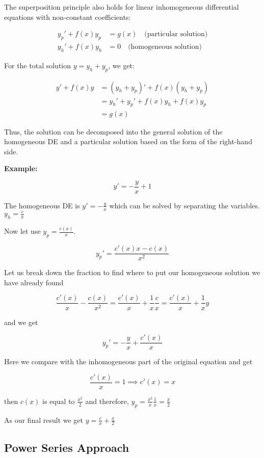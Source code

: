 The superposition principle also holds for linear inhomogeneous differential equations with 
non-constant coefficients:

\begin{align*}
    y_p' + f(x)y_p &= g(x) \quad \text{(particular solution)} \\
    y_h' + f(x)y_h &= 0 \quad \text{(homogeneous solution)}
\end{align*}

For the total solution \( y = y_h + y_p \), we get:

\begin{align*}
    y' + f(x)y 
    &= (y_h + y_p)' + f(x)(y_h + y_p) \\
    &= y_h' + y_p' + f(x)y_h + f(x)y_p \\
    &= g(x)
\end{align*}

Thus, the solution can be decomposed into the general solution of the homogeneous DE and a 
particular solution based on the form of the right-hand side.

\textbf{Example: }

\[
    y' = -\frac{y}{x} + 1
\]

The homogeneous DE is \(y' = -\frac{y}{x}\) which can be solved by separating the variables.
\(y_h = \frac{c}{x}\)

Now let use \(y_p = \frac{c(x)}{x}\).

\[
    y_{p}' = \frac{c'(x)x - c(x)}{x^2}
\]

Let us break down the fraction to find where to put our homogeneous solution we have already found

\[
    \frac{c'(x)}{x} - \frac{c(x)}{x^2} = \frac{c'(x)}{x} + \frac{1}{x}\frac{c}{x} 
    = \frac{c'(x)}{x} + \frac{1}{x}y
\]

and we get

\[
    y_{p}' = -\frac{y}{x} + \frac{c'(x)}{x} 
\]

Here we compare with the inhomogeneous part of the original equation and get

\[
    \frac{c'(x)}{x} = 1 \implies c'(x) = x
\]

then \(c(x)\) is equal to \(\frac{x^2}{2}\) and therefore, \(y_p = \frac{x^2}{x}\frac{1}{x} = 
\frac{x}{2}\)

As our final result we get \(y = \frac{c}{x} + \frac{x}{2}\)

\subsection{Power Series Approach}

